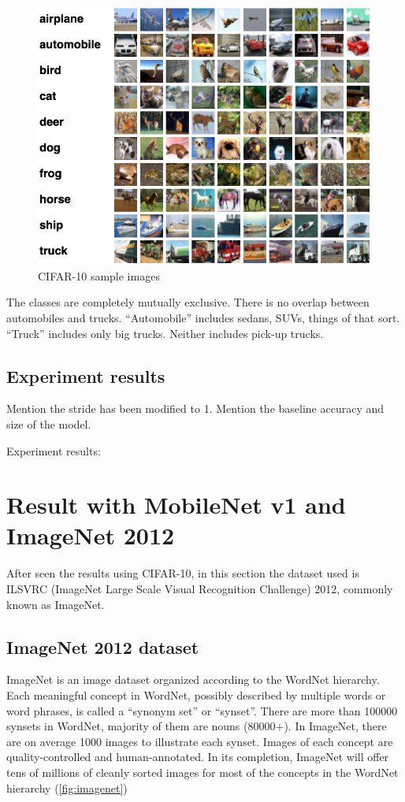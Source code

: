 \begin{figure}[ht]
    \includegraphics[width=\textwidth]{images/results/CIFAR_10.png}
    \centering
    \caption{CIFAR-10 sample images}\label{fig:CIFAR_10}
\end{figure}

The classes are completely mutually exclusive. There is no overlap between
automobiles and trucks. ``Automobile'' includes sedans, SUVs, things of that
sort. ``Truck'' includes only big trucks. Neither includes pick-up trucks.

\subsection{Experiment results}
Mention the stride has been modified to 1.
Mention the baseline accuracy and size of the model.

Experiment results: 

\section{Result with MobileNet v1 and ImageNet 2012}
After seen the results using CIFAR-10, in this section the dataset used is
ILSVRC (ImageNet Large Scale Visual Recognition Challenge) 2012, commonly known
as ImageNet.

\subsection{ImageNet 2012 dataset}
ImageNet is an image dataset organized according to the WordNet hierarchy. Each
meaningful concept in WordNet, possibly described by multiple words or word
phrases, is called a ``synonym set'' or ``synset''. There are more than 100000
synsets in WordNet, majority of them are nouns (80000+). In ImageNet, there are
on average 1000 images to illustrate each synset.
Images of each concept are quality-controlled and human-annotated. In its
completion, ImageNet will offer tens of millions of cleanly sorted images for
most of the concepts in the WordNet hierarchy (\autoref{fig:imagenet})


